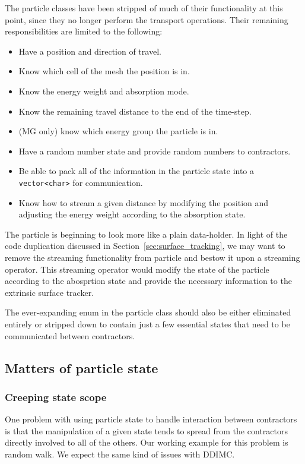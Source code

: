 \documentclass[memo]{ResearchNote}
\begin{document}
The particle classes have been stripped of much of their functionality
at this point, since they no longer perform the transport
operations. Their remaining responsibilities are limited to the
following:
\begin{itemize}
  \item Have a position and direction of travel. 
  \item Know which cell of the mesh the position is in.
  \item Know the energy weight and absorption mode.
  \item Know the remaining travel distance to the end of the
    time-step.
  \item (MG only) know which energy group the particle is in.
  \item Have a random number state and provide random numbers to
    contractors.
  \item Be able to pack all of the information in the particle state
    into a {\tt vector<char>} for communication.
  \item Know how to stream a given distance by modifying the position
    and adjusting the energy weight according to the absorption state.
\end{itemize}

The particle is beginning to look more like a plain data-holder. In
light of the code duplication discussed in
Section~\ref{sec:surface_tracking}, we may want to remove the
streaming functionality from particle and bestow it upon a streaming
operator. This streaming operator would modify the state of the
particle according to the abosprtion state and provide the necessary
information to the extrinsic surface tracker.

The ever-expanding enum in the particle class should also be either
eliminated entirely or stripped down to contain just a few essential
states that need to be communicated between contractors.

\subsection{Matters of particle state} \label{sec:State}

\subsubsection{Creeping state scope}

One problem with using particle state to handle interaction between
contractors is that the manipulation of a given state tends to spread
from the contractors directly involved to all of the others.  Our
working example for this problem is random walk. We expect the same
kind of issues with DDIMC.
\end{document}
